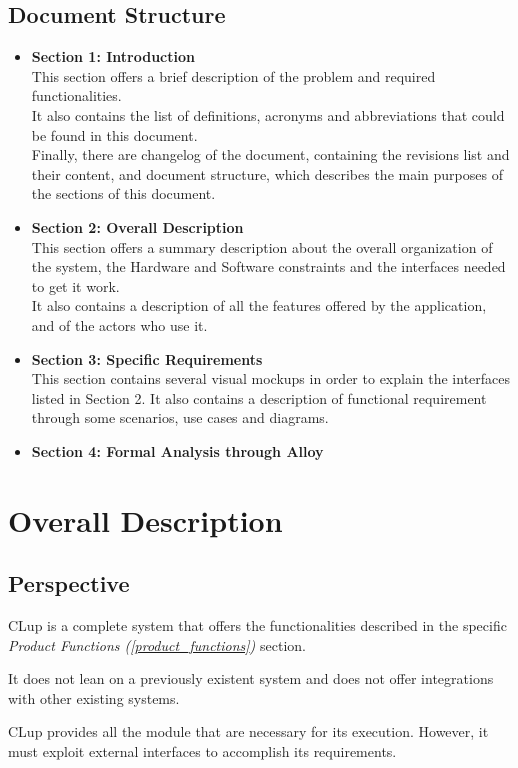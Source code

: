 \documentclass[table, 12pt]{article}
\begin{document}
\subsection{Document Structure}
\begin{itemize}
    \item {\textbf{Section 1: Introduction}\\This section offers a brief description of the problem and required functionalities. \\It also contains the list of definitions, acronyms and abbreviations that could be found in this document. \\Finally, there are changelog of the document, containing the revisions list and their content, and document structure, which describes the main purposes of the sections of this document.}
    \item {\textbf{Section 2: Overall Description}\\This section offers a summary description about the overall organization of the system, the Hardware and Software constraints and the interfaces needed to get it work.\\It also contains a description of all the features offered by the application, and of the actors who use it.}
    \item {\textbf{Section 3: Specific Requirements}\\This section contains several visual mockups in order to explain the interfaces listed in Section 2. It also contains a description of functional requirement through some scenarios, use cases and diagrams.}
    \item {\textbf{Section 4: Formal Analysis through Alloy}}
\end{itemize}
\newpage
\section{Overall Description}
\subsection{Perspective}
CLup is a complete system that offers the functionalities described in the specific \textit{Product Functions (\ref{product_functions})} section.

It does not lean on a previously existent system and does not offer integrations with other existing systems.

CLup provides all the module that are necessary for its execution. However, it must exploit external interfaces to accomplish its requirements.
\end{document}
